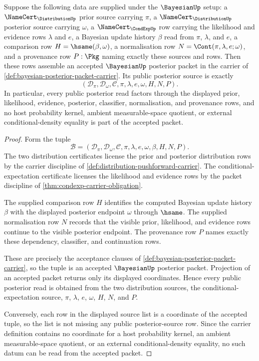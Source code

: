 \begin{theorem}
\label{thm:bayesian-posterior-packet-carrier-introduction}
Suppose the following data are supplied under the $\BayesianUp$ setup: a $\NameCert_{\DistributionUp}$ prior source carrying $\pi$, a $\NameCert_{\DistributionUp}$ posterior source carrying $\omega$, a $\NameCert_{\CondExpUp}$ row carrying the likelihood and evidence rows $\lambda$ and $e$, a Bayesian update history $\beta$ read from $\pi$, $\lambda$, and $e$, a comparison row $H=\hsame(\beta,\omega)$, a normalisation row $N=\Cont(\pi,\lambda,e;\omega)$, and a provenance row $P:\Pkg$ naming exactly these sources and rows. Then these rows assemble an accepted $\BayesianUp$ posterior packet in the carrier of \autoref{def:bayesian-posterior-packet-carrier}. Its public posterior source is exactly
$$
(\mathcal{D}_{\pi},\mathcal{D}_{\omega},\mathcal{C},\pi,\lambda,e,\omega,H,N,P).
$$
In particular, every public posterior read factors through the displayed prior, likelihood, evidence, posterior, classifier, normalisation, and provenance rows, and no host probability kernel, ambient measurable-space quotient, or external conditional-density equality is part of the accepted packet.
\end{theorem}
\begin{proof}
Form the tuple
$$
\mathcal{B}=(\mathcal{D}_{\pi},\mathcal{D}_{\omega},\mathcal{C},\pi,\lambda,e,\omega,\beta,H,N,P).
$$
The two distribution certificates license the prior and posterior distribution rows by the carrier discipline of \autoref{def:distribution-pushforward-carrier}. The conditional-expectation certificate licenses the likelihood and evidence rows by the packet discipline of \autoref{thm:condexp-carrier-obligation}.

The supplied comparison row $H$ identifies the computed Bayesian update history $\beta$ with the displayed posterior endpoint $\omega$ through $\hsame$. The supplied normalisation row $N$ records that the visible prior, likelihood, and evidence rows continue to the visible posterior endpoint. The provenance row $P$ names exactly these dependency, classifier, and continuation rows.

These are precisely the acceptance clauses of \autoref{def:bayesian-posterior-packet-carrier}, so the tuple is an accepted $\BayesianUp$ posterior packet. Projection of an accepted packet returns only its displayed coordinates. Hence every public posterior read is obtained from the two distribution sources, the conditional-expectation source, $\pi$, $\lambda$, $e$, $\omega$, $H$, $N$, and $P$.

Conversely, each row in the displayed source list is a coordinate of the accepted tuple, so the list is not missing any public posterior-source row. Since the carrier definition contains no coordinate for a host probability kernel, an ambient measurable-space quotient, or an external conditional-density equality, no such datum can be read from the accepted packet.
\end{proof}

